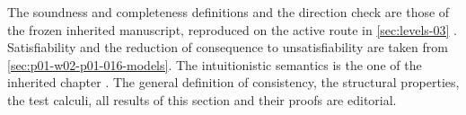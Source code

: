 The soundness and completeness definitions and the direction check are those
of the frozen inherited manuscript, reproduced on the active route in
\cref{sec:levels-03}
\cite[ch.~``Levels, Objects, and Consequence'', definitions ``Soundness'' and
``Completeness'', warning ``Direction check'']{FrozenFormalLogicConsistencyComparison}.
Satisfiability and the reduction of consequence to unsatisfiability are taken
from \cref{sec:p01-w02-p01-016-models}. The intuitionistic semantics is the
one of the inherited chapter \cite[ch.~``Intuitionistic Logic'', definitions
``Intuitionistic Kripke frame and structure'' and ``Intuitionistic semantic
consequence'']{FrozenFormalLogicConsistencyComparison}. The general
definition of consistency, the structural properties, the test calculi, all
results of this section and their proofs are editorial.
